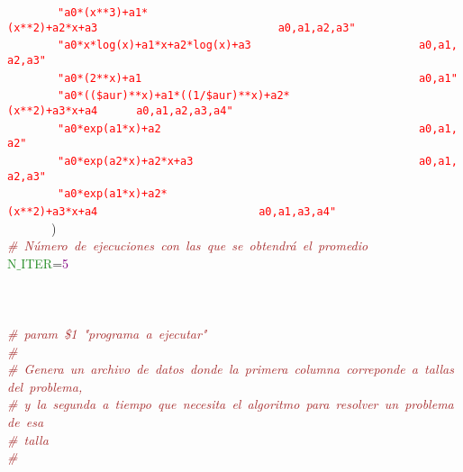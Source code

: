 \mbox{}\ \ \ \ \ \ \ \ \texttt{\textcolor{Red}{"{}a0*(x**3)+a1*(x**2)+a2*x+a3\ \ \ \ \ \ \ \ \ \ \ \ \ \ \ \ \ \ \ \ \ \ \ \ \ \ \ \ a0,a1,a2,a3"{}}} \\
\mbox{}\ \ \ \ \ \ \ \ \texttt{\textcolor{Red}{"{}a0*x*log(x)+a1*x+a2*log(x)+a3\ \ \ \ \ \ \ \ \ \ \ \ \ \ \ \ \ \ \ \ \ \ \ \ \ \ a0,a1,a2,a3"{}}} \\
\mbox{}\ \ \ \ \ \ \ \ \texttt{\textcolor{Red}{"{}a0*(2**x)+a1\ \ \ \ \ \ \ \ \ \ \ \ \ \ \ \ \ \ \ \ \ \ \ \ \ \ \ \ \ \ \ \ \ \ \ \ \ \ \ \ \ \ \ a0,a1"{}}} \\
\mbox{}\ \ \ \ \ \ \ \ \texttt{\textcolor{Red}{"{}a0*((\$aur)**x)+a1*((1/\$aur)**x)+a2*(x**2)+a3*x+a4\ \ \ \ \ \ a0,a1,a2,a3,a4"{}}} \\
\mbox{}\ \ \ \ \ \ \ \ \texttt{\textcolor{Red}{"{}a0*exp(a1*x)+a2\ \ \ \ \ \ \ \ \ \ \ \ \ \ \ \ \ \ \ \ \ \ \ \ \ \ \ \ \ \ \ \ \ \ \ \ \ \ \ \ a0,a1,a2"{}}} \\
\mbox{}\ \ \ \ \ \ \ \ \texttt{\textcolor{Red}{"{}a0*exp(a2*x)+a2*x+a3\ \ \ \ \ \ \ \ \ \ \ \ \ \ \ \ \ \ \ \ \ \ \ \ \ \ \ \ \ \ \ \ \ \ \ a0,a1,a2,a3"{}}} \\
\mbox{}\ \ \ \ \ \ \ \ \texttt{\textcolor{Red}{"{}a0*exp(a1*x)+a2*(x**2)+a3*x+a4\ \ \ \ \ \ \ \ \ \ \ \ \ \ \ \ \ \ \ \ \ \ \ \ \ a0,a1,a3,a4"{}}}\  \\
\mbox{}\ \ \ \ \ \ \ \textcolor{BrickRed}{)} \\
\mbox{}\textit{\textcolor{Brown}{\#\ Número\ de\ ejecuciones\ con\ las\ que\ se\ obtendrá\ el\ promedio}} \\
\mbox{}\textcolor{ForestGreen}{N$\_$ITER}\textcolor{BrickRed}{=}\textcolor{Purple}{5} \\
\mbox{} \\
\mbox{} \\
\mbox{} \\
\mbox{}\textit{\textcolor{Brown}{\#\ param\ \$1\ "{}programa\ a\ ejecutar"{}}} \\
\mbox{}\textit{\textcolor{Brown}{\#}} \\
\mbox{}\textit{\textcolor{Brown}{\#\ Genera\ un\ archivo\ de\ datos\ donde\ la\ primera\ columna\ correponde\ a\ tallas\ del\ problema,}} \\
\mbox{}\textit{\textcolor{Brown}{\#\ y\ la\ segunda\ a\ tiempo\ que\ necesita\ el\ algoritmo\ para\ resolver\ un\ problema\ de\ esa}} \\
\mbox{}\textit{\textcolor{Brown}{\#\ talla}} \\
\mbox{}\textit{\textcolor{Brown}{\#}} \\
